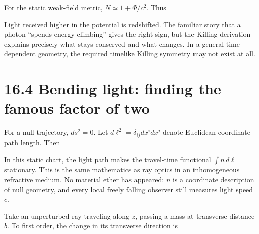 \documentclass[
  11pt,
  letterpaper,
  oneside,
  openany]{scrbook}
\begin{document}
For the static weak-field metric, \(N\simeq1+\Phi/c^2\). Thus

\begin{center}
\begingroup
{}
\ifdim\wd\grmathbox>\linewidth
\resizebox{\linewidth}{!}{\usebox{\grmathbox}}
\else\usebox{\grmathbox}\fi
\endgroup
\end{center}

Light received higher in the potential is redshifted. The familiar story
that a photon ``spends energy climbing'' gives the right sign, but the
Killing derivation explains precisely what stays conserved and what
changes. In a general time-dependent geometry, the required timelike
Killing symmetry may not exist at all.

\hypertarget{bending-light-finding-the-famous-factor-of-two}{%
\section{16.4 Bending light: finding the famous factor of
two}\label{bending-light-finding-the-famous-factor-of-two}}

For a null trajectory, \(ds^2=0\). Let \(d\ell^2=\delta_{ij}dx^i dx^j\)
denote Euclidean coordinate path length. Then

\begin{center}
\begingroup
{}
\ifdim\wd\grmathbox>\linewidth
\resizebox{\linewidth}{!}{\usebox{\grmathbox}}
\else\usebox{\grmathbox}\fi
\endgroup
\end{center}

In this static chart, the light path makes the travel-time functional
\(\int n\,d\ell\) stationary. This is the same mathematics as ray optics
in an inhomogeneous refractive medium. No material ether has appeared:
\(n\) is a coordinate description of null geometry, and every local
freely falling observer still measures light speed \(c\).

Take an unperturbed ray traveling along \(z\), passing a mass at
transverse distance \(b\). To first order, the change in its transverse
direction is

\begin{center}
\begingroup
{}
\ifdim\wd\grmathbox>\linewidth
\resizebox{\linewidth}{!}{\usebox{\grmathbox}}
\else\usebox{\grmathbox}\fi
\endgroup
\end{center}
\end{document}

